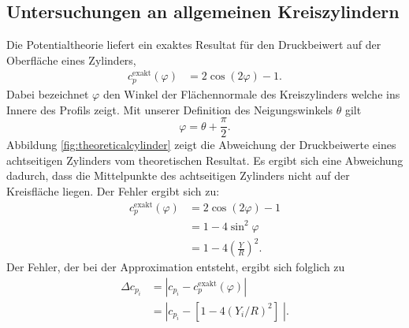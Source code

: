 \subsection{Untersuchungen an allgemeinen Kreiszylindern} \label{chap:analyticalcylinder}
Die Potentialtheorie liefert ein exaktes Resultat für den Druckbeiwert auf der Oberfläche eines Zylinders, \cite{Cebeci:1999}
\begin{align}
c_p^\mathrm{exakt} (\varphi ) &=  2 \cos{(2\varphi )} -1.
\end{align}
Dabei bezeichnet $\varphi$ den Winkel der Flächennormale des Kreiszylinders welche ins Innere des Profils zeigt. Mit unserer Definition des Neigungswinkels $\theta$ gilt
\begin{equation}
\varphi = \theta +  \frac{\pi }{2}.
\end{equation}
Abbildung \ref{fig:theoreticalcylinder} zeigt die Abweichung der Druckbeiwerte eines achtseitigen Zylinders vom theoretischen Resultat. Es ergibt sich eine Abweichung dadurch, dass die Mittelpunkte des achtseitigen Zylinders nicht auf der Kreisfläche liegen. Der Fehler ergibt sich zu:
\begin{align}
c_p^\mathrm{exakt} (\varphi ) &=  2 \cos{(2\varphi )} -1 \\
&= 1 - 4 \sin^2 \varphi \\
&= 1 - 4 \left( \frac{Y}{R}\right)^2.
\end{align}
Der Fehler, der bei der Approximation entsteht, ergibt sich folglich zu
\begin{align}
\Delta c_{p_{i}} &= |c_{p_{i}} - c_p^\mathrm{exakt} (\varphi )| \\
&= |c_{p_{i}} -[ 1 - 4 (Y_{i}/R)^2 ] \;|.
\end{align}

